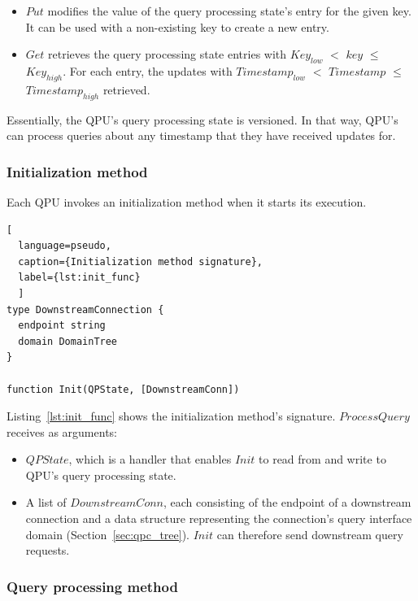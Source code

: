 \begin{itemize}
  \item $Put$ modifies the value of the query processing state's entry for the given key.
  It can be used with a non-existing key to create a new entry.

  \item $Get$ retrieves the query processing state entries with $Key_{low}$ $<$ $key$ $\leq$ $Key_{high}$.
  For each entry, the updates with $Timestamp_{low}$ $<$ $Timestamp$ $\leq$ $Timestamp_{high}$ retrieved.
\end{itemize}

Essentially, the QPU's query processing state is versioned.
In that way, QPU's can process queries about any timestamp that they have received updates for.


\subsubsection{Initialization method}
\label{sec:initialization_func}

Each QPU invokes an initialization method when it starts its execution.

\begin{lstlisting}[
  language=pseudo,
  caption={Initialization method signature},
  label={lst:init_func}
  ]
type DownstreamConnection {
  endpoint string
  domain DomainTree
}

function Init(QPState, [DownstreamConn])
\end{lstlisting}

\noindent
Listing~\ref{lst:init_func} shows the initialization method's signature.
$ProcessQuery$ receives as arguments:
\begin{itemize}
  \item $QPState$, which is a handler that enables $Init$ to read from and write to QPU's query processing state.

  \item A list of $DownstreamConn$, each consisting of the endpoint of a downstream connection and a data structure
  representing the connection's query interface domain (Section~\ref{sec:qpc_tree}).
  $Init$ can therefore send downstream query requests.
\end{itemize}


\subsubsection{Query processing method}
\label{sec:query_processing_func}


